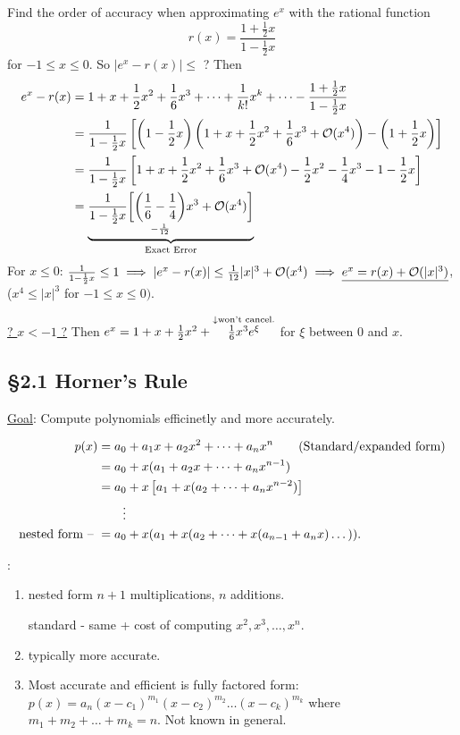 \documentclass[]{article}
\begin{document}
\begin{example}
	Find the order of accuracy when approximating $e^x$ with the rational function
	$$r(x) = \frac{1+\frac12x}{1-\frac12x}$$ for $-1\leq x\leq 0$. So $|e^x-r(x)|\leq$ ?
	Then
	\begin{align*}
		e^x-r(x) &= 1+x+\frac12x^2+\frac16x^3+\dots+\frac1{k!}x^k+\dots -\frac{1+\frac12x}{1-\frac12x} \\
				 &= \frac1{1-\frac12x}\blr{\plr{1-\frac12x}\plr{1+x+\frac12x^2+\frac16x^3 + \mc O(x^4)} - \plr{1+\frac12x}} \\
				 &= \frac1{1-\frac12x}\blr{1+x+\frac12x^2+\frac16x^3+\mc O(x^4) - \frac12x^2 - \frac14x^3 - 1 - \frac12x} \\
				 &= \ub{\text{Exact Error}}{\frac1{1-\frac12x}\bigg[\us{-\frac1{12}}{\plr{\frac16-\frac14}}x^3+\mc O(x^4)\bigg]}
	\end{align*}
	For $x\leq0$: $\frac1{1-\frac12x}\leq 1 \implies |e^x-r(x)| \leq \frac1{12}|x|^3 + \mc O(x^4) \implies \ul{e^x = r(x) + \mc O(|x|^3)}$,
	($x^4\leq|x|^3$ for $-1\leq x\leq0)$.

	\ul{? $x<-1$ ?}
	Then $e^x = 1+x+\frac12x^2+\os{\downarrow\text{won't cancel.}}{\frac16x^3e^\xi}$ for $\xi$ between 0 and $x$.
\end{example}

\subsection*{\S2.1 Horner's Rule}

\ul{Goal}: Compute polynomials efficinetly and more accurately.

\begin{align*}
	p(x) &= a_0+a_1x+a_2x^2 + \dots + a_nx^n \qquad \text{(Standard/expanded form)} \\
		 &= a_0 + x(a_1 + a_2x+\dots + a_nx^{n-1}) \\
		 &= a_0 + x\blr{a_1+x(a_2+\dots+a_nx^{n-2})} \\
		 & \qquad \vdots \\
	\text{nested form -- } &= a_0 + x(a_1 + x(a_2 + \dots + x(a_{n-1}+a_nx)\dots)).
\end{align*}
\begin{note}:
	\begin{enumerate}
		\item nested form $n+1$ multiplications, $n$ additions.
			
			standard - same + cost of computing $x^2,x^3,\dots,x^n$.
		\item typically more accurate.
		\item Most accurate and efficient is fully factored form:
			$p(x) = a_n(x-c_1)^{m_1}(x-c_2)^{m_2}\dots(x-c_k)^{m_k}$
			where $m_1+m_2+\dots+m_k = n$.
			Not known in general.
	\end{enumerate}
\end{note}
\end{document}
